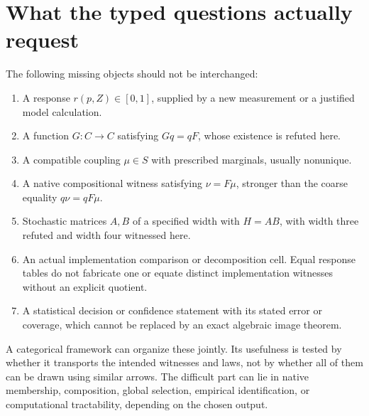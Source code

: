 \documentclass[11pt]{article}
\theoremstyle{definition}
\begin{document}
\section{What the typed questions actually request}
The following missing objects should not be interchanged:
\begin{enumerate}
 \item A response $r(p,Z)\in[0,1]$, supplied by a new measurement or a justified model calculation.
 \item A function $G:C\to C$ satisfying $Gq=qF$, whose existence is refuted here.
 \item A compatible coupling $\mu\in S$ with prescribed marginals, usually nonunique.
 \item A native compositional witness satisfying $\nu=F\mu$, stronger than the coarse equality $q\nu=qF\mu$.
 \item Stochastic matrices $A,B$ of a specified width with $H=AB$, with width three refuted and width four witnessed here.
 \item An actual implementation comparison or decomposition cell. Equal response tables do not fabricate one or equate distinct implementation witnesses without an explicit quotient.
 \item A statistical decision or confidence statement with its stated error or coverage, which cannot be replaced by an exact algebraic image theorem.
\end{enumerate}
A categorical framework can organize these jointly. Its usefulness is tested by whether it transports the intended witnesses and laws, not by whether all of them can be drawn using similar arrows. The difficult part can lie in native membership, composition, global selection, empirical identification, or computational tractability, depending on the chosen output.
\end{document}
